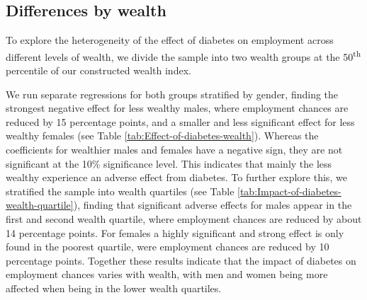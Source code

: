 \FloatBarrier

\subsection{Differences by wealth}

To explore the heterogeneity of the effect of diabetes on employment
across different levels of wealth, we divide the sample into two wealth
groups at the 50\textsuperscript{th} percentile of our constructed
wealth index.



We run separate regressions for both groups stratified by gender,
finding the strongest negative effect for less wealthy males, where
employment chances are reduced by 15 percentage points, and a smaller
and less significant effect for less wealthy females (see Table \ref{tab:Effect-of-diabetes-wealth}).
Whereas the coefficients for wealthier males and females have a negative
sign, they are not significant at the 10\% significance level.
This indicates that mainly the less wealthy experience an adverse
effect from diabetes. To further explore this, we stratified the sample
into wealth quartiles (see Table \ref{tab:Impact-of-diabetes-wealth-quartile}), finding that significant adverse effects for males
appear in the first and second wealth quartile, where employment chances
are reduced by about 14 percentage points. For females a highly significant
and strong effect is only found in the poorest quartile, were employment
chances are reduced by 10 percentage points. Together these results
indicate that the impact of diabetes on employment chances varies
with wealth, with men and women being more affected when being in
the lower wealth quartiles.

